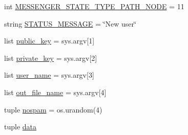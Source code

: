 \begin{DoxyCompactItemize}
\item 
int \hyperlink{namespacemake-funny-savefile_ac5b1417b7099928d302427e1796c0ca6}{M\+E\+S\+S\+E\+N\+G\+E\+R\+\_\+\+S\+T\+A\+T\+E\+\_\+\+T\+Y\+P\+E\+\_\+\+P\+A\+T\+H\+\_\+\+N\+O\+D\+E} = 11
\item 
string \hyperlink{namespacemake-funny-savefile_a870f058e594b4630f1fbdead925295b0}{S\+T\+A\+T\+U\+S\+\_\+\+M\+E\+S\+S\+A\+G\+E} = \char`\"{}New user\char`\"{}
\item 
list \hyperlink{namespacemake-funny-savefile_a6734667aeff5c30ad9e5624ccb556a87}{public\+\_\+key} = sys.\+argv\mbox{[}1\mbox{]}
\item 
list \hyperlink{namespacemake-funny-savefile_a5a3d86d5947e79874a3853a272fccd3b}{private\+\_\+key} = sys.\+argv\mbox{[}2\mbox{]}
\item 
list \hyperlink{namespacemake-funny-savefile_a4176a45fbd4c8ae5f0c58cbedb659359}{user\+\_\+name} = sys.\+argv\mbox{[}3\mbox{]}
\item 
list \hyperlink{namespacemake-funny-savefile_a9d9b61e68e45b3a112225bdb23f9cc19}{out\+\_\+file\+\_\+name} = sys.\+argv\mbox{[}4\mbox{]}
\item 
tuple \hyperlink{namespacemake-funny-savefile_a2581b35f119a2bbce475223789ed742c}{nospam} = os.\+urandom(4)
\item 
tuple \hyperlink{namespacemake-funny-savefile_aa7a0efb8690a34f61a95b00cc723ca27}{data}
\end{DoxyCompactItemize}
